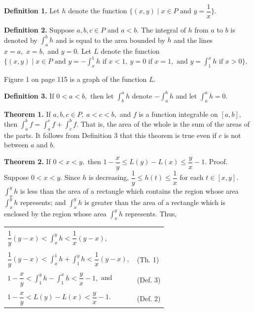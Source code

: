 \textbf{Definition 1.}  Let $h$ denote the function $\{(x, y) \mid x \in P \text{~and~}y = \dfrac{1}{x}\}.$\nl

\textbf{Definition 2.}  Suppose $a, b, c \in P$ and $a < b.$  The integral of $h$ from $a$ to $b$ is denoted by $\int_{a}^{b} h$ and is equal to the area bounded by $h$ and the lines $x = a,\,\, x = b,$ and $y = 0.$\nl
\indent Let $L$ denote the function $\{(x, y)\mid x \in P \text{~and~} y = -\int_{x}^{1} h \text{~if~} x < 1,~y = 0 \text{~if~} x = 1, \text{~and~} y = \int_{1}^{x} h \text{~if~} x > 0\}.$\nl

Figure 1 on page 115 is a graph of the function $L.$\nl

\textbf{Definition 3.}  If $0 < a < b,$ then let $\int_{b}^{a} h$ denote $-\int_{a}^{b} h$ and let $\int_{a}^{a} h = 0.$\nl




\textbf{Theorem 1.} If $a,b,c \in P,~a < c < b,$ and $f$ is a function integrable on $[a, b],$ then
$\int_{a}^{b} f = \int_{a}^{c} f + \int_{c}^{b} f.$   That is, the area of the whole is the sum of the areas of the parts.  It follows from Definition 3 that this theorem is true even if $c$ is not between $a$ and $b.$\nl

\textbf{Theorem 2.} If $0 < x < y,$ then $1 - \dfrac{x}{y} \leq L(y) - L(x) \leq \dfrac{y}{x} - 1.$\nl
Proof.  Suppose $0 < x < y.$  Since $h$ is decreasing, $\dfrac{1}{y} \leq h(t) \leq \dfrac{1}{x}$ for each
$t\in [x, y].$  $\int_{x}^{y} h$ is less than the area of a rectangle which contains the region whose area $\int_{x}^{y} h$ represents;\nl
and $\int_{x}^{y} h$ is greater than the area of a rectangle which is enclosed by the region whose area
$\int_{x}^{y} h$ represents.   Thus,\nl
\begin{tabular}{l l}
&\\
$\dfrac{1}{y}(y - x) < \int_{x}^{y} h < \dfrac{1}{x}(y - x),$&\\
&\\
$\dfrac{1}{y}(y - x) < \int_{x}^{1} h + \int_{1}^{y} h < \dfrac{1}{x}(y - x),$&(Th. 1)\\
&\\
$1 - \dfrac{x}{y} < \int_{1}^{y} h - \int_{1}^{x} h < \dfrac{y}{x} - 1,$ and&(Def. 3)\\
&\\
$1 - \dfrac{x}{y} < L(y) - L(x) < \dfrac{y}{x} -1.$&(Def. 2)\\
\end{tabular}\nl

